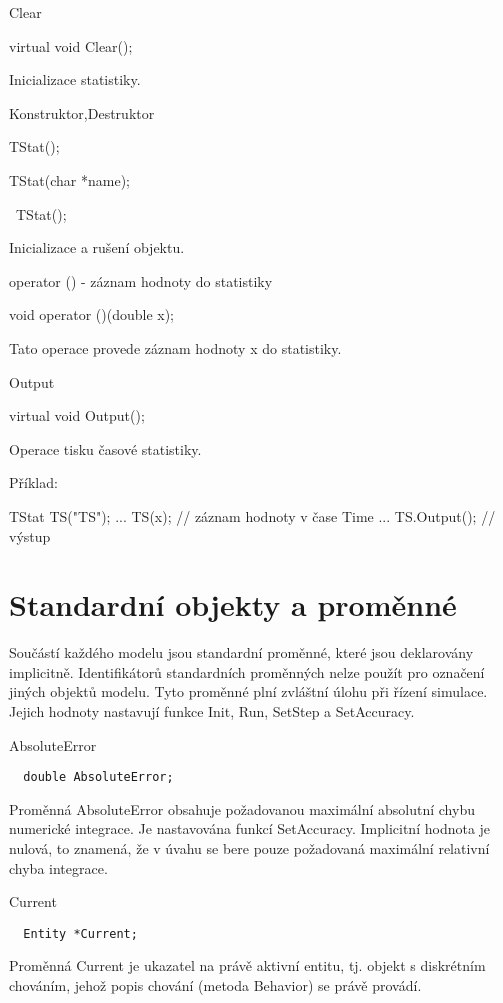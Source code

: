 \documentclass[a4paper]{article}
\begin{document}
Clear

  virtual void Clear();


Inicializace statistiky.


Konstruktor,Destruktor

  TStat();

  TStat(char *name);

  ~TStat();


Inicializace a rušení objektu.


operator () - záznam hodnoty do statistiky

  void operator ()(double x);


Tato operace provede záznam hodnoty x do statistiky.


Output

  virtual void Output();


Operace tisku časové statistiky.

Příklad:

TStat  TS("TS");
  ...
  TS(x);        // záznam hodnoty v čase Time
  ...
  TS.Output();  // výstup



\section{Standardní objekty a proměnné}

Součástí každého modelu jsou standardní proměnné, které jsou deklarovány
implicitně. Identifikátorů standardních proměnných nelze použít pro
označení jiných objektů modelu. Tyto proměnné plní zvláštní úlohu
při řízení simulace. Jejich hodnoty nastavují funkce Init,
Run, SetStep a SetAccuracy.


AbsoluteError

\begin{verbatim}
  double AbsoluteError;
\end{verbatim}


Proměnná AbsoluteError obsahuje požadovanou maximální absolutní
chybu numerické integrace. Je nastavována funkcí SetAccuracy.
Implicitní hodnota je nulová, to znamená, že v úvahu se bere pouze
požadovaná maximální relativní chyba integrace.


Current

\begin{verbatim}
  Entity *Current;
\end{verbatim}


Proměnná Current je ukazatel na právě aktivní entitu, tj.
objekt s diskrétním chováním, jehož popis chování (metoda Behavior)
se právě provádí.
\end{document}
